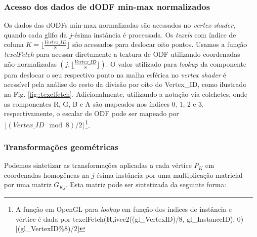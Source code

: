 \subsubsection{Acesso dos dados de dODF min-max normalizados}
Os dados das dODFs min-max normalizadas são acessados no \textit{vertex shader}, quando cada glifo da $j$-ésima instância é processada. Os \textit{texels} com índice de coluna $K = \lfloor\frac{Vertex\_ID}{8} \rfloor$ são acessados para deslocar oito pontos. Usamos a função \textit{texelFetch} para acessar diretamente a textura de ODF utilizando coordenadas não-normalizadas $(j, \lfloor\frac{Vertex\_ID}{8} \rfloor)$. O valor utilizado para \textit{lookup} da componente  para deslocar o seu respectivo ponto na malha esférica no \textit{vertex shader} é acessível pela análise do resto da divisão por oito do Vertex\_ID, como ilustrado na Fig. \ref{fig::texelfetch}. Adicionalmente, utilizando a notação via colchetes, onde as componentes R, G, B e A são mapeados nos índices 0, 1, 2 e 3, respectivamente, o escalar de ODF pode ser mapeado por $\lfloor (Vertex\_ID \mod{8})/2 \rfloor$\footnote{A função em OpenGL para \textit{lookup} em função dos índices de instância e vértice é dada por texelFetch($\mathbf{R}$,ivec2((gl\_VertexID)/8, gl\_InstanceID), 0)[(gl\_VertexID\%8)/2]}.


\subsubsection{Transformações geométricas}

Podemos sintetizar as transformações aplicadas a cada vértice $P_K$ em coordenadas homogêneas na $j$-ésima instância por uma multiplicação matricial por uma matriz $G_{Kj}$. Esta matriz pode ser sintetizada da seguinte forma:

